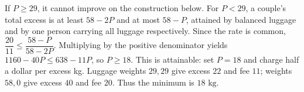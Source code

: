If $P\ge29$, it cannot improve on the construction below. For $P<29$, a couple's total excess is at least $58-2P$ and at most $58-P$, attained by balanced luggage and by one person carrying all luggage respectively. Since the rate is common, $\dfrac{20}{11}\le\dfrac{58-P}{58-2P}$. Multiplying by the positive denominator yields $1160-40P\le638-11P$, so $P\ge18$. This is attainable: set $P=18$ and charge half a dollar per excess kg. Luggage weights $29,29$ give excess $22$ and fee $11$; weights $58,0$ give excess $40$ and fee $20$. Thus the minimum is $\boxed{18\text{ kg}}$.
